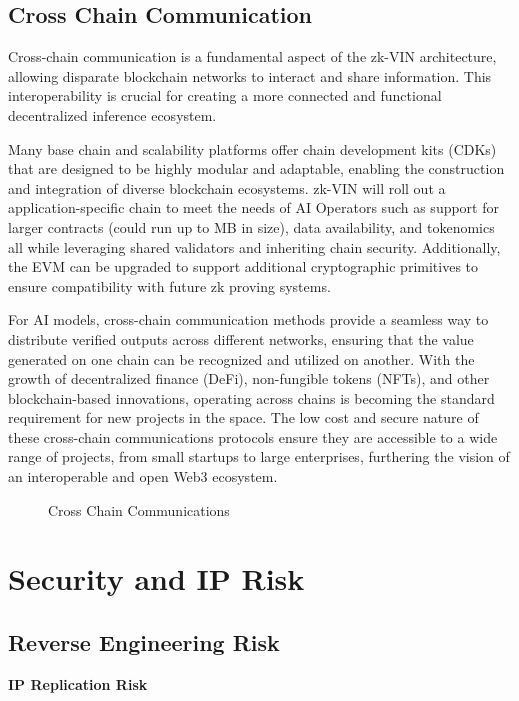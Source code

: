\documentclass[conference]{IEEEtran}
\begin{document}
\subsection{Cross Chain Communication}
Cross-chain communication is a fundamental aspect of the zk-VIN architecture, allowing disparate blockchain networks to interact and share information. This interoperability is crucial for creating a more connected and functional decentralized inference ecosystem.

Many base chain and scalability platforms offer chain development kits (CDKs) that are designed to be highly modular and adaptable, enabling the construction and integration of diverse blockchain ecosystems.  zk-VIN will roll out a application-specific chain to meet the needs of AI Operators such as support for larger contracts (could run up to MB in size), data availability, and tokenomics all while leveraging shared validators and inheriting chain security. Additionally, the EVM can be upgraded to support additional cryptographic primitives to ensure compatibility with future zk proving systems. 

For AI models, cross-chain communication methods provide a seamless way to distribute verified outputs across different networks, ensuring that the value generated on one chain can be recognized and utilized on another. With the growth of decentralized finance (DeFi), non-fungible tokens (NFTs), and other blockchain-based innovations, operating across chains is becoming the standard requirement for new projects in the space. The low cost and secure nature of these cross-chain communications protocols ensure they are accessible to a wide range of projects, from small startups to large enterprises, furthering the vision of an interoperable and open Web3 ecosystem.

\begin{figure}[!ht]
    \centering
    
    \caption{Cross Chain Communications}
    \label{fig:Fig 9}
\end{figure}
\newpage

\section{Security and IP Risk}
\subsection{Reverse Engineering Risk}
\noindent \textbf{IP Replication Risk}
\end{document}
